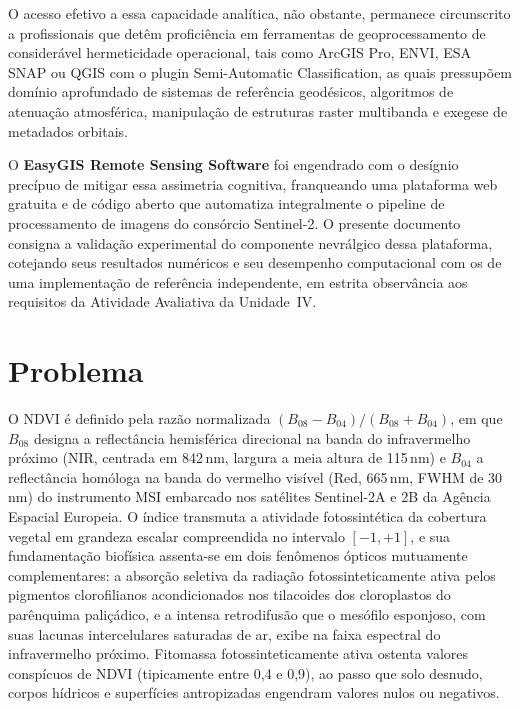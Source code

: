 \documentclass[10pt, a4paper]{article}
\begin{document}
O acesso efetivo a essa capacidade analítica, não obstante, permanece circunscrito a profissionais que detêm proficiência em ferramentas de geoprocessamento de considerável hermeticidade operacional, tais como ArcGIS Pro, ENVI, ESA SNAP ou QGIS com o plugin Semi-Automatic Classification, as quais pressupõem domínio aprofundado de sistemas de referência geodésicos, algoritmos de atenuação atmosférica, manipulação de estruturas raster multibanda e exegese de metadados orbitais.

O \textbf{EasyGIS Remote Sensing Software} foi engendrado com o desígnio precípuo de mitigar essa assimetria cognitiva, franqueando uma plataforma web gratuita e de código aberto que automatiza integralmente o pipeline de processamento de imagens do consórcio Sentinel-2. O presente documento consigna a validação experimental do componente nevrálgico dessa plataforma, cotejando seus resultados numéricos e seu desempenho computacional com os de uma implementação de referência independente, em estrita observância aos requisitos da Atividade Avaliativa da Unidade~IV.

\section{Problema}

O NDVI é definido pela razão normalizada $(B_{08} - B_{04}) / (B_{08} + B_{04})$, em que $B_{08}$ designa a reflectância hemisférica direcional na banda do infravermelho próximo (NIR, centrada em 842\,nm, largura a meia altura de 115\,nm) e $B_{04}$ a reflectância homóloga na banda do vermelho visível (Red, 665\,nm, FWHM de 30\,nm) do instrumento MSI embarcado nos satélites Sentinel-2A e 2B da Agência Espacial Europeia. O índice transmuta a atividade fotossintética da cobertura vegetal em grandeza escalar compreendida no intervalo $[-1, +1]$, e sua fundamentação biofísica assenta-se em dois fenômenos ópticos mutuamente complementares: a absorção seletiva da radiação fotossinteticamente ativa pelos pigmentos clorofilianos acondicionados nos tilacoides dos cloroplastos do parênquima paliçádico, e a intensa retrodifusão que o mesófilo esponjoso, com suas lacunas intercelulares saturadas de ar, exibe na faixa espectral do infravermelho próximo. Fitomassa fotossinteticamente ativa ostenta valores conspícuos de NDVI (tipicamente entre 0,4 e 0,9), ao passo que solo desnudo, corpos hídricos e superfícies antropizadas engendram valores nulos ou negativos.
\end{document}
